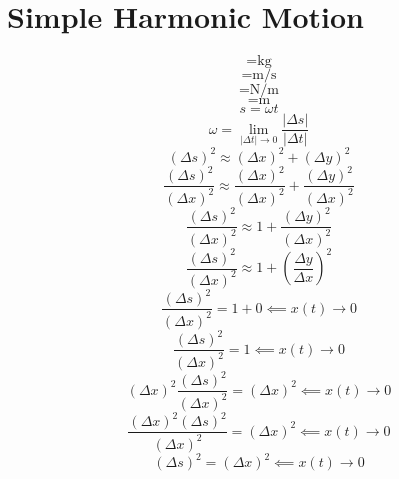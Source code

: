 \documentclass[a4paper,12pt]{report}
\begin{document}
\section{Simple Harmonic Motion}
\begin{equation}
[m] = \text{kg}
\end{equation}
\begin{equation}
[\omega] = \text{m/s}
\end{equation}
\begin{equation}
[k] = \text{N/m}
\end{equation}
\begin{equation}
[r] = \text{m}
\end{equation}
\begin{equation}
s = \omega t
\end{equation}
\begin{equation}
\omega = \lim \limits_{\left|\Delta t\right| \to 0} \frac{\left|\Delta s\right|}{\left|\Delta t\right|}
\end{equation}
\begin{equation}
(\Delta s)^2 \approx (\Delta x)^2 + (\Delta y)^2
\end{equation}
\begin{equation}
\frac{(\Delta s)^2}{(\Delta x)^2} \approx \frac{(\Delta x)^2}{(\Delta x)^2} + \frac{(\Delta y)^2}{(\Delta x)^2}
\end{equation}
\begin{equation}
\frac{(\Delta s)^2}{(\Delta x)^2} \approx 1 + \frac{(\Delta y)^2}{(\Delta x)^2}
\end{equation}
\begin{equation}
\frac{(\Delta s)^2}{(\Delta x)^2} \approx 1 + \left(\frac{\Delta y}{\Delta x}\right)^2
\end{equation}
\begin{equation}
\frac{(\Delta s)^2}{(\Delta x)^2} = 1 + 0 \impliedby x(t) \to 0
\end{equation}
\begin{equation}
\frac{(\Delta s)^2}{(\Delta x)^2} = 1 \impliedby x(t) \to 0
\end{equation}
\begin{equation}
(\Delta x)^2 \frac{(\Delta s)^2}{(\Delta x)^2} = (\Delta x)^2 \impliedby x(t) \to 0
\end{equation}
\begin{equation}
\frac{(\Delta x)^2 (\Delta s)^2}{(\Delta x)^2} = (\Delta x)^2 \impliedby x(t) \to 0
\end{equation}
\begin{equation}
(\Delta s)^2 = (\Delta x)^2 \impliedby x(t) \to 0
\end{equation}
\end{document}
